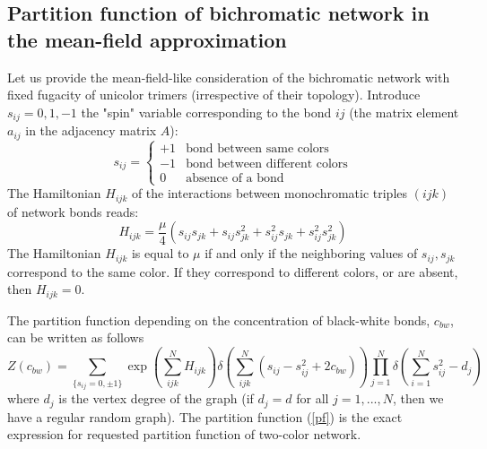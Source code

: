 \documentclass[aps,12pt]{revtex4}
\newcommand{\eq}[1]{(\ref{#1})}
\newcommand{\be}{\begin{equation}}
\newcommand{\ee}{\end{equation}}
\begin{document}
\begin{appendix}

\section{Partition function of bichromatic network in the mean-field approximation}

Let us provide the mean-field-like consideration of the bichromatic network with fixed fugacity of unicolor trimers (irrespective of their topology).  Introduce $s_{ij}=0,1,-1$ the "spin" variable corresponding to the bond $ij$ (the matrix element $a_{ij}$ in the adjacency matrix $A$):
\be
s_{ij}=\left\{\begin{array}{cl} +1 & \mbox{bond between same colors} \\ -1 & \mbox{bond between different colors} \\ 0 & \mbox{absence of a bond} \end{array} \right.
\ee
The Hamiltonian $H_{ijk}$ of the interactions between monochromatic triples $(ijk)$ of network bonds reads:
\be
H_{ijk}=\frac{\mu}{4}\left(s_{ij} s_{jk} + s_{ij} s^2_{jk} + s^2_{ij} s_{jk} + s^2_{ij} s^2_{jk}
\right)
\ee
The Hamiltonian $H_{ijk}$ is equal to $\mu$ if and only if the neighboring values of $s_{ij}, s_{jk}$ correspond to the same color. If they correspond to different colors, or are absent, then $H_{ijk}=0$.

The partition function depending on the concentration of black-white bonds, $c_{bw}$, can be written as follows
\be
Z(c_{bw}) = \sum_{\{s_{ij}=0,\pm 1\}}\exp\left(\sum_{ijk}^N H_{ijk}\right)
\delta\left(\sum_{ijk}^N\left(s_{ij}-s^2_{ij}+2c_{bw}\right)\right)
\prod_{j=1}^N\delta\left(\sum_{i=1}^Ns^2_{ij}-d_j\right)
\label{pf}
\ee
where $d_j$ is the vertex degree of the graph (if $d_j=d$ for all $j=1,...,N$, then we have a regular random graph). The partition function \eq{pf} is the exact expression for requested partition function of two-color network.


\end{appendix}
\end{document}

